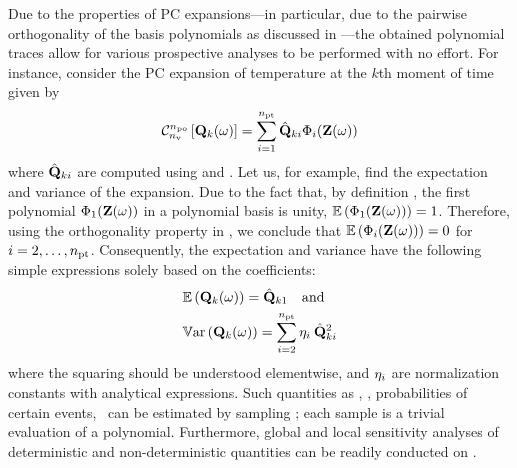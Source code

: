 Due to the properties of PC expansions---in particular, due to the pairwise orthogonality of the basis polynomials as discussed in ---the obtained polynomial traces allow for various prospective analyses to be performed with no effort. For instance, consider the PC expansion of temperature at the $k$th moment of time given by
\begin{equation} \elabel{pc-k}
  \oPC{\nvars}{\pcorder}{\vTO_k(\o)} = \sum_{i = 1}^{\pcterms} \pcc{\vTO}_{ki} \pcb_i(\vZ(\o))
\end{equation}
where $\hat{\mathbf{Q}}_{ki}$ are computed using  and . Let us, for example, find the expectation and variance of the expansion.
Due to the fact that, by definition \cite{xiu2010}, the first polynomial $\Phi_1(\mathbf{Z}(\omega))$ in a polynomial basis is unity, $\mathbb{E}\left(\Phi_1(\mathbf{Z}(\omega))\right) = 1$.
Therefore, using the orthogonality property in , we conclude that $\mathbb{E}\left(\Phi_i(\mathbf{Z}(\omega))\right) = 0$ for $i = 2, \dotsc, {n_\text{pt}}$.
Consequently, the expectation and variance have the following simple expressions solely based on the coefficients:
\begin{equation} \elabel{pc-moments}
\begin{aligned}
  & \oExp{\vTO_k(\o)} = \pcc{\vTO}_{k1} \hspace{1em} \text{and} \\
  & \oVar{\vTO_k(\o)} = \sum_{i = 2}^{\pcterms} \pcn_i \: \pcc{\vTO}_{ki}^2
\end{aligned}
\end{equation}
where the squaring should be understood elementwise, and $\eta_i$ are normalization constants with analytical expressions. Such quantities as \cdfs, \pdfs, probabilities of certain events, \etc\ can be estimated by sampling ; each sample is a trivial evaluation of a polynomial. Furthermore, global and local sensitivity analyses of deterministic and non-deterministic quantities can be readily conducted on .
